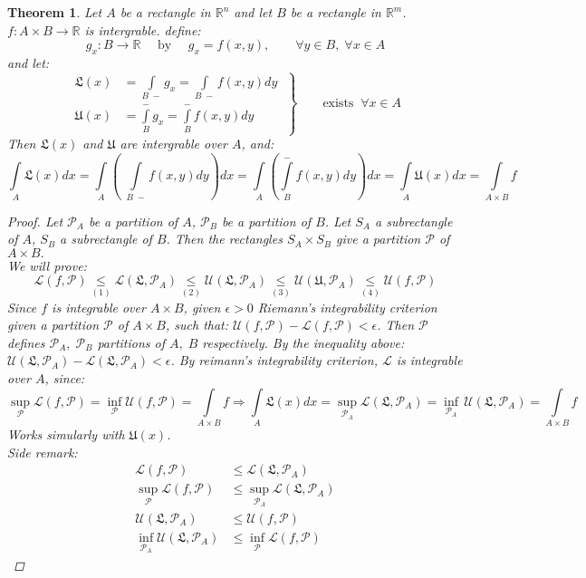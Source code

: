 \documentclass[12pt]{article}
\def\RR{\mathbb{R}}
\newtheorem{theorem}{Theorem}[section]
\begin{document}
\begin{theorem}
Let $A$ be a rectangle in $\RR^n$ and let $B$ be a rectangle in $\RR^m$. $f:A \times B \rightarrow \RR$ is intergrable. define: 
\[ g_x: B \rightarrow \RR \quad  \text{ by } \quad g_x = f(x,y) , \qquad  \forall y \in B,\;  \forall x \in A \]
and let: 
\[ \left.\begin{aligned}
       \mathfrak{L}(x) &=  \int\limits_{B \;-}g_x =\int\limits_{B \;-}f(x,y)dy\\
       \mathfrak{U}(x) &=  \int\limits_{B}^{-}g_x =\int\limits_{B}^{-}f(x,y)dy
       \end{aligned}
 \; \right\}
 \qquad \text{exists} \; \; \forall x \in A\]
Then $\mathfrak{L}(x)$ and $\mathfrak{U}$ are intergrable over $A$, and:
\[\int\limits_{A}\mathfrak{L}(x)dx =\int\limits_{A} \left(\;\int\limits_{B \;-}f(x,y)dy \right)\! dx=\int\limits_{A} \left(\int\limits_{B}^{-}f(x,y)dy \right)\! dx = \int\limits_{A}\mathfrak{U}(x)dx = \int\limits_{A \times B}f\]
\begin{proof}
Let $\mathcal{P}_A$ be a partition of $A$, $\mathcal{P}_B$ be a partition of $B$. Let $S_A$ a subrectangle of $A$,  $S_B$ a subrectangle of $B$. Then the rectangles $S_A \times S_B$ give a partition $\mathcal{P}$ of $A\times B.$ \\
We will prove:
\[\mathcal{L}(f,\mathcal{P}) \underset{(1)}{\leq} \mathcal{L}(\mathfrak{L},\mathcal{P}_A) \underset{(2)}{\leq} \mathcal{U}(\mathfrak{L},\mathcal{P}_A) \underset{(3)}{\leq} \mathcal{U}(\mathfrak{U},\mathcal{P}_A) \underset{(4)}{\leq} \mathcal{U}(f,\mathcal{P})\]
Since $f$ is integrable over $A \times B$, given $\epsilon > 0$ Riemann's integrability criterion given a partition $\mathcal{P}$ of $A \times B$, such that: $\mathcal{U}(f,\mathcal{P}) - \mathcal{L}(f,\mathcal{P}) < \epsilon $. Then $\mathcal{P}$ defines $\mathcal{P}_A ,\; \mathcal{P}_B$ partitions of $A, \; B$ respectively. By the inequality above: $\mathcal{U}(\mathfrak{L},\mathcal{P}_A) - \mathcal{L}(\mathfrak{L},\mathcal{P}_A) < \epsilon $. By reimann's integrability criterion, $\mathcal{L}$ is integrable over $A$, since: 
\[\sup_{\mathcal{P}}\mathcal{L}(f,\mathcal{P})= \inf_{\mathcal{P}}\mathcal{U}(f,\mathcal{P}) = \int\limits_{A\times B}\! \! f \Rightarrow \int\limits_{A}\mathfrak{L}(x)dx = \sup_{\mathcal{P}_A}\mathcal{L}(\mathfrak{L},\mathcal{P}_A)= \inf_{\mathcal{P}_A}\,\mathcal{U}(\mathfrak{L},\mathcal{P}_A) = \int\limits_{A\times B}\! \!f\]
Works simularly with $\mathfrak{U}(x)$.\\
Side remark:
\begin{align*}
\mathcal{L}(f, \mathcal{P}) &\leq \mathcal{L}(\mathfrak{L}, \mathcal{P}_A)\\
\sup_{\mathcal{P}}\mathcal{L}(f, \mathcal{P}) &\leq \sup_{\mathcal{P}_A}\mathcal{L}(\mathfrak{L}, \mathcal{P}_A)\\
\mathcal{U}(\mathfrak{L}, \mathcal{P}_A) &\leq \mathcal{U}(f, \mathcal{P})\\
\inf_{\mathcal{P}_A}\mathcal{U}(\mathfrak{L}, \mathcal{P}_A) &\leq \inf_{\mathcal{P}}\mathcal{L}(f, \mathcal{P})
\end{align*}


\end{proof}
\end{theorem}
\end{document}
